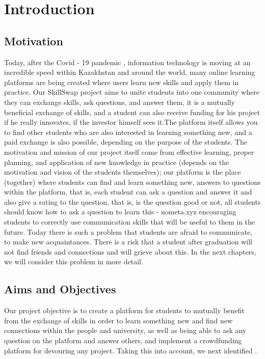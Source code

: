\chapter{Introduction}\label{ch:intro}

\section{Motivation}\label{motivation}
Today, after the Covid - 19 pandemic \cite{covid}, information technology is moving at an incredible speed within Kazakhstan and around the world, many online learning platforms are being created where users learn new skills and apply them in practice. Our SkillSwap \cite{skillswap} project aims to unite students into one community where they can exchange skills, ask questions, and answer them, it is a mutually beneficial exchange of skills, and a student can also receive funding for his project if he really innovates, if the investor himself sees it.The platform itself allows you to find other students who are also interested in learning something new, and a paid exchange is also possible, depending on the purpose of the students. The motivation and mission of our project itself come from effective learning, proper planning, and application of new knowledge in practice (depends on the motivation and vision of the students themselves); our platform is the place (together) where students can find and learn something new, answers to questions within the platform, that is, each student can ask a question and answer it and also give a rating to the question, that is, is the question good or not, all students should know how to ask a question to learn this -  nometa.xyz \cite{nometa} encouraging students to correctly use communication skills that will be useful to them in the future. Today there is such a problem that students are afraid to communicate, to make new acquaintances. There is a risk that a student after graduation will not find friends and connections and will grieve about this. In the next chapters, we will consider this problem in more detail.

\newpage
\section{Aims and Objectives}\label{aimsobj}

Our project objective is to create a platform for students to mutually benefit from the exchange of skills in order to learn something new and find new connections within the people and university, as well as being able to ask any question on the platform and answer others, and implement a crowdfunding platform \cite{crowdfunding} for devouring any project. Taking this into account, we next identified .

